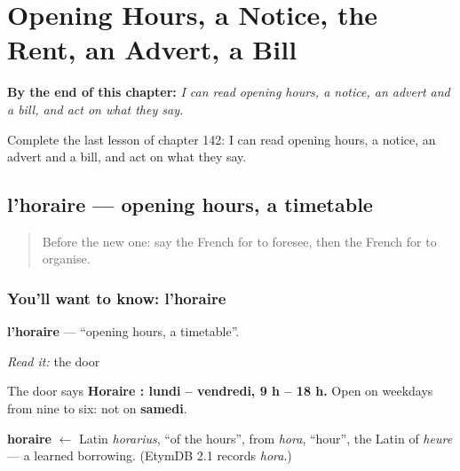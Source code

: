 
\chapter{Opening Hours, a Notice, the Rent, an Advert, a Bill}
\label{ch:fr-opening-hours-a-notice-the-rent-an-advert-a-bill}

\begin{chapteropening}
\textbf{By the end of this chapter:} \emph{I can read opening hours, a notice, an advert and a bill, and act on what they say.}

Complete the last lesson of chapter 142: I can read opening hours, a notice, an advert and a bill, and act on what they say.
\end{chapteropening}

\section[l'horaire]{l'horaire — opening hours, a timetable}

\label{lesson:FR-C142-lhoraire}



\begin{quote}
Before the new one: say the French for to foresee, then the French for to organise.
\end{quote}

\subsection*{You'll want to know: l'horaire}
\textbf{l'horaire} — \textquotedblleft{}opening hours, a timetable\textquotedblright{}.

\emph{Read it:} the door

The door says \textbf{Horaire : lundi – vendredi, 9 h – 18 h.} Open on weekdays from nine to six: not on \textbf{samedi}.

\begin{cousinweb}
\textbf{horaire} $\leftarrow$ Latin \emph{horarius}, \textquotedblleft{}of the hours\textquotedblright{}, from \emph{hora}, \textquotedblleft{}hour\textquotedblright{}, the Latin of \emph{heure} — a learned borrowing. (EtymDB 2.1 records \emph{hora}.)
\end{cousinweb}

